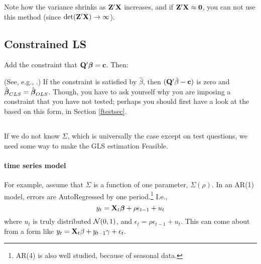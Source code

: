 
Note how the variance shrinks as ${\bf Z}'{\bf X}$ increases, and if
${\bf Z}'{\bf X}\approx{\bf 0}$, you can not use this method (since
$\det({\bf Z}'{\bf X}) \to \infty$). 

\subsection{Constrained LS }
\label{constrainedls}

Add the constraint that ${\bf Q}'{\mbox{\boldmath$\beta$}}={\bf c}$. Then:

(See, e.g., \cite{amemiya:ez}.)
If the constraint is satisfied by $\hat\beta$, then
$({\bf Q}'\hat\beta-{\bf c})$ is zero and $\hat{{\mbox{\boldmath$\beta$}}}_{CLS}=\hat{{\mbox{\boldmath$\beta$}}}_{OLS}$.
Though, you have to ask yourself why you are imposing a constraint that
you have not tested; perhaps you should first have a look at the 
based on this form, in Section \ref{ftestsec}.

\subsection{} 

If we do not know $\Sigma$, which is universally the case except on
test questions, we need some way to make the GLS estimation Feasible. 

\label{ts}
\paragraph{ time series model}
For example, assume that $\Sigma$ is a function of one parameter, $\Sigma(\rho)$.  
In an AR(1) model, errors are AutoRegressed by one period.\footnote{AR(4) is
also well studied, because of seasonal data.} I.e.,
$$y_t={\bf X}_t{\mbox{\boldmath$\beta$}} + \rho\epsilon_{t-1} + u_t$$
where $u_t$ is truly distributed ${\cal N}(0,1)$, and $\epsilon_t=
\rho\epsilon_{t-1} + u_t$. This can come about from  a form like
$y_t={\bf X}_t\beta + y_{t-1}\gamma + \epsilon_t.$


